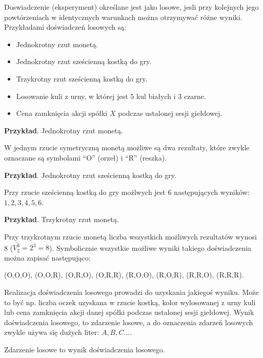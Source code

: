 \documentclass[
  letterpaper,
  DIV=11,
  numbers=noendperiod]{scrreprt}
\begin{document}
Doswiadczenie (eksperyment) określane jest jako losowe, jesli przy
kolejnych jego powtórzeniach w identycznych warunkach można otrzymywać
różne wyniki. Przykładami doświadczeń losowych są:

\begin{itemize}
\item
  Jednokrotny rzut monetą.
\item
  Jednokrotny rzut sześcienną kostką do gry.
\item
  Trzykrotny rzut sześcienną kostką do gry.
\item
  Losowanie kuli z urny, w której jest 5 kul białych i 3 czarne.
\item
  Cena zamknięcia akcji spółki \(X\) podczas ustalonej sesji giełdowej.
\end{itemize}

\textbf{Przykład}. Jednokrotny rzut monetą.

W jednym rzucie symetryczną monetą możliwe są dwa rezultaty, które
zwykle oznaczane są symbolami ``O'' (orzeł) i ``R'' (reszka).

\textbf{Przykład}. Jednokrotny rzut sześcienną kostką do gry.

Przy rzucie sześcienną kostką do gry możlwych jest 6 następujących
wyników: \(1, 2, 3, 4, 5, 6\).

\textbf{Przykład}. Trzykrotny rzut monetą.

Przy trzykrotnym rzucie monetą liczba wszystkich możliwych rezultatów
wynosi 8 (\(\bar{V_2^3}=2^3=8\)). Symbolicznie wszystkie możliwe wyniki
takiego doświadczenia można zapisać następująco:

(O,O,O), (O,O,R), (O,R,O), (O,R,R), (R,O,O), (R,O,R), (R,R,O), (R,R,R).

Realizacja doświadczenia losowego prowadzi do uzyskania jakiegoś wyniku.
Może to być np. liczba oczek uzyskana w rzucie kostką, kolor wylosowanej
z urny kuli lub cena zamknięcia akcji danej spółki podczas ustalonej
sesji giełdowej. Wynik doświadczenia losowego, to zdarzenie losowe, a do
oznaczenia zdarzeń losowych zwykle używa się dużych liter:
\(A, B, C ...\).

\begin{tcolorbox}[enhanced jigsaw, toprule=.15mm, title=\textcolor{quarto-callout-note-color}{\faInfo}\hspace{0.5em}{Zdarzenie losowe}, breakable, coltitle=black, titlerule=0mm, colbacktitle=quarto-callout-note-color!10!white, opacitybacktitle=0.6, opacityback=0, bottomtitle=1mm, left=2mm, arc=.35mm, leftrule=.75mm, bottomrule=.15mm, rightrule=.15mm, toptitle=1mm, colframe=quarto-callout-note-color-frame, colback=white]

Zdarzenie losowe to wynik doświadczenia losowego.

\end{tcolorbox}
\end{document}
